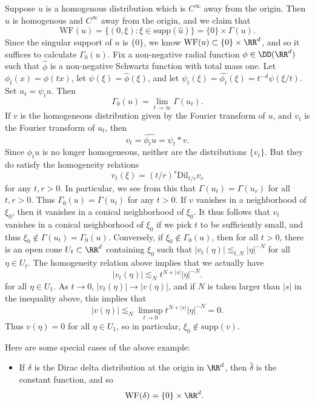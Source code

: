 \begin{example}
  Suppose $u$ is a homogenous distribution which is $C^\infty$ away from the origin. Then $\widehat{u}$ is homogenous and $C^\infty$ away from the origin, and we claim that
  \[ \text{WF}(u) = \{ (0,\xi): \xi \in \text{supp}(\widehat{u}) \} = \{ 0 \} \times \Gamma(u). \]
  Since the singular support of $u$ is $\{ 0 \}$, we know $\text{WF}(u) \subset \{ 0 \} \times \RR^d$, and so it suffices to calculate $\Gamma_0(u)$. Fix a non-negative radial function $\phi \in \DD(\RR^d)$ such that $\widehat{\phi}$ is a non-negative Schwartz function with total mass one. Let $\phi_t(x) = \phi(tx)$, let $\psi(\xi) = \widehat{\phi}(\xi)$, and let $\psi_t(\xi) = \widehat{\phi_t}(\xi) = t^{-d} \psi(\xi/t)$. Set $u_t = \psi_t u$. Then
  \[ \Gamma_0(u) = \lim_{t \to \infty} \Gamma(u_t). \]
  If $v$ is the homogeneous distribution given by the Fourier transform of $u$, and $v_t$ is the Fourier transform of $u_t$, then
  \[ v_t = \widehat{\phi_t u} = \psi_t * v. \]
  Since $\phi_t u$ is no longer homogeneous, neither are the distributions $\{ v_t \}$. But they do satisfy the homogeneity relations
  \[ v_t(\xi) = (t/r)^s \text{Dil}_{t/r} v_r \]
  for any $t,r > 0$. In particular, we see from this that $\Gamma(u_t) = \Gamma(u_r)$ for all $t,r > 0$. Thus $\Gamma_0(u) = \Gamma(u_t)$ for any $t > 0$. If $v$ vanishes in a neighborhood of $\xi_0$, then it vanishes in a conical neighborhood of $\xi_0$. It thus follows that $v_t$ vanishes in a conical neighborhood of $\xi_0$ if we pick $t$ to be sufficiently small, and thus $\xi_0 \not \in \Gamma(u_t) = \Gamma_0(u)$. Conversely, if $\xi_0 \not \in \Gamma_0(u)$, then for all $t > 0$, there is an open cone $U_t \subset \RR^d$ containing $\xi_0$ such that $|v_t(\eta)| \lesssim_{t,N} |\eta|^{-N}$ for all $\eta \in U_t$. The homogeneity relation above implies that we actually have
  \[ |v_t(\eta)| \lesssim_N t^{N + |s|} |\eta|^{-N}. \]
  for all $\eta \in U_1$. As $t \to 0$, $|v_t(\eta)| \to |v(\eta)|$, and if $N$ is taken larger than $|s|$ in the inequality above, this implies that
  \[ |v(\eta)| \lesssim_N \limsup_{t \to 0} t^{N + |s|} |\eta|^{-N} = 0. \]
  Thus $v(\eta) = 0$ for all $\eta \in U_1$, so in particular, $\xi_0 \not \in \text{supp}(v)$.

  Here are some special cases of the above example:
  \begin{itemize}
    \item If $\delta$ is the Dirac delta distribution at the origin in $\RR^d$, then $\widehat{\delta}$ is the constant function, and so
    \[ \text{WF}(\delta) = \{ 0 \} \times \RR^d. \]


\end{itemize}
\end{example}
